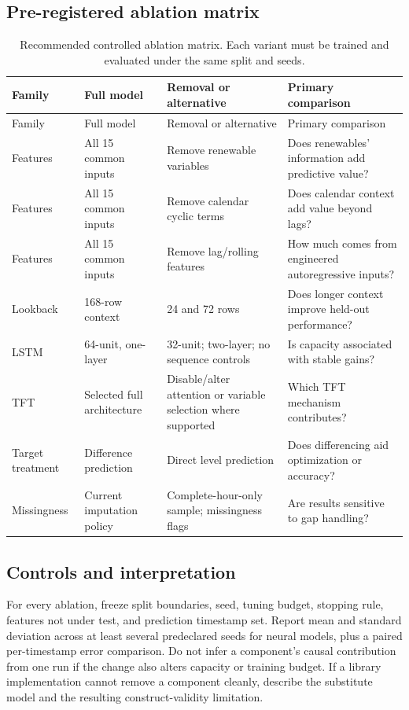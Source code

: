 \documentclass[12pt,a4paper]{article}
\begin{document}
\subsection{Pre-registered ablation matrix}
\begin{longtable}{p{.16\linewidth}p{.31\linewidth}p{.28\linewidth}p{.17\linewidth}}
\caption{Recommended controlled ablation matrix. Each variant must be trained and evaluated under the same split and seeds.}\\
\toprule Family & Full model & Removal or alternative & Primary comparison \\\midrule\endfirsthead
\toprule Family & Full model & Removal or alternative & Primary comparison \\\midrule\endhead
Features & All 15 common inputs & Remove renewable variables & Does renewables' information add predictive value?\\
Features & All 15 common inputs & Remove calendar cyclic terms & Does calendar context add value beyond lags?\\
Features & All 15 common inputs & Remove lag/rolling features & How much comes from engineered autoregressive inputs?\\
Lookback & 168-row context & 24 and 72 rows & Does longer context improve held-out performance?\\
LSTM & 64-unit, one-layer & 32-unit; two-layer; no sequence controls & Is capacity associated with stable gains?\\
TFT & Selected full architecture & Disable/alter attention or variable selection where supported & Which TFT mechanism contributes?\\
Target treatment & Difference prediction & Direct level prediction & Does differencing aid optimization or accuracy?\\
Missingness & Current imputation policy & Complete-hour-only sample; missingness flags & Are results sensitive to gap handling?\\
\bottomrule\end{longtable}

\subsection{Controls and interpretation}
For every ablation, freeze split boundaries, seed, tuning budget, stopping rule, features not under test, and prediction timestamp set. Report mean and standard deviation across at least several predeclared seeds for neural models, plus a paired per-timestamp error comparison. Do not infer a component's causal contribution from one run if the change also alters capacity or training budget. If a library implementation cannot remove a component cleanly, describe the substitute model and the resulting construct-validity limitation.
\end{document}
